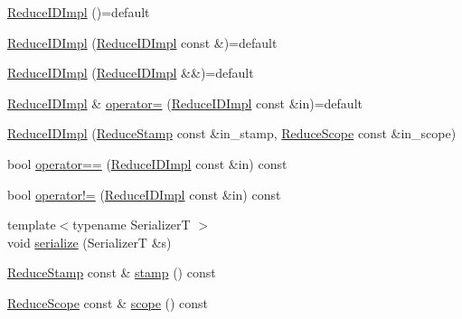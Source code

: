 \begin{DoxyCompactItemize}
\item 
\hyperlink{structvt_1_1collective_1_1reduce_1_1detail_1_1_reduce_i_d_impl_a02838391cc76625466de53c8197baead}{Reduce\+I\+D\+Impl} ()=default
\item 
\hyperlink{structvt_1_1collective_1_1reduce_1_1detail_1_1_reduce_i_d_impl_afc9000bf90d9cde00276e559a070bd17}{Reduce\+I\+D\+Impl} (\hyperlink{structvt_1_1collective_1_1reduce_1_1detail_1_1_reduce_i_d_impl}{Reduce\+I\+D\+Impl} const \&)=default
\item 
\hyperlink{structvt_1_1collective_1_1reduce_1_1detail_1_1_reduce_i_d_impl_a3476a2d196c68a45ffef12333e6cdf5d}{Reduce\+I\+D\+Impl} (\hyperlink{structvt_1_1collective_1_1reduce_1_1detail_1_1_reduce_i_d_impl}{Reduce\+I\+D\+Impl} \&\&)=default
\item 
\hyperlink{structvt_1_1collective_1_1reduce_1_1detail_1_1_reduce_i_d_impl}{Reduce\+I\+D\+Impl} \& \hyperlink{structvt_1_1collective_1_1reduce_1_1detail_1_1_reduce_i_d_impl_a96f5723202097c667e0c01a707528f82}{operator=} (\hyperlink{structvt_1_1collective_1_1reduce_1_1detail_1_1_reduce_i_d_impl}{Reduce\+I\+D\+Impl} const \&in)=default
\item 
\hyperlink{structvt_1_1collective_1_1reduce_1_1detail_1_1_reduce_i_d_impl_ac0e808d85213c4fedc3d1bae43744aed}{Reduce\+I\+D\+Impl} (\hyperlink{namespacevt_1_1collective_1_1reduce_1_1detail_abcd205dec83706f347d55c7528bf2664}{Reduce\+Stamp} const \&in\+\_\+stamp, \hyperlink{structvt_1_1collective_1_1reduce_1_1detail_1_1_reduce_scope}{Reduce\+Scope} const \&in\+\_\+scope)
\item 
bool \hyperlink{structvt_1_1collective_1_1reduce_1_1detail_1_1_reduce_i_d_impl_a9bcc8db2ce4c3c2cb2606a9bdd93debb}{operator==} (\hyperlink{structvt_1_1collective_1_1reduce_1_1detail_1_1_reduce_i_d_impl}{Reduce\+I\+D\+Impl} const \&in) const
\item 
bool \hyperlink{structvt_1_1collective_1_1reduce_1_1detail_1_1_reduce_i_d_impl_a9c445823cc9899b72bfcbb811b8d2603}{operator!=} (\hyperlink{structvt_1_1collective_1_1reduce_1_1detail_1_1_reduce_i_d_impl}{Reduce\+I\+D\+Impl} const \&in) const
\item 
{\footnotesize template$<$typename SerializerT $>$ }\\void \hyperlink{structvt_1_1collective_1_1reduce_1_1detail_1_1_reduce_i_d_impl_ad5b9cd7f62b54fca25932232cb6baebd}{serialize} (SerializerT \&s)
\item 
\hyperlink{namespacevt_1_1collective_1_1reduce_1_1detail_abcd205dec83706f347d55c7528bf2664}{Reduce\+Stamp} const  \& \hyperlink{structvt_1_1collective_1_1reduce_1_1detail_1_1_reduce_i_d_impl_a72f8c00e09eeb3106b162c9d5b06af05}{stamp} () const
\item 
\hyperlink{structvt_1_1collective_1_1reduce_1_1detail_1_1_reduce_scope}{Reduce\+Scope} const  \& \hyperlink{structvt_1_1collective_1_1reduce_1_1detail_1_1_reduce_i_d_impl_adc91349dad2340899b7a11df59528ef2}{scope} () const
\end{DoxyCompactItemize}
